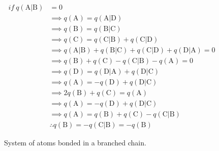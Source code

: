 \begin{align}
    if\: q(\mathrm{A}|\mathrm{B}) &= 0 \nonumber\\
      & \implies q(\mathrm{A}) = q(\mathrm{A}|\mathrm{D}) \nonumber \\
      & \implies q(\mathrm{B}) = q(\mathrm{B}|\mathrm{C}) \nonumber \\
      & \implies q(\mathrm{C}) = q(\mathrm{C}|\mathrm{B}) + q(\mathrm{C}|\mathrm{D}) \nonumber \\
      & \implies q(\mathrm{A}|\mathrm{B}) + q(\mathrm{B}|\mathrm{C}) + q(\mathrm{C}|\mathrm{D}) + q(\mathrm{D}|\mathrm{A}) = 0 \nonumber \\
      & \implies q(\mathrm{B}) + q(\mathrm{C}) - q(\mathrm{C}|\mathrm{B}) - q(\mathrm{A}) = 0 \nonumber \\
      & \implies q(\mathrm{D}) = q(\mathrm{D}|\mathrm{A}) + q(\mathrm{D}|\mathrm{C}) \nonumber \\
      & \implies q(\mathrm{A}) = -q(\mathrm{D}) + q(\mathrm{D}|\mathrm{C}) \nonumber \\
      & \implies 2q(\mathrm{B}) + q(\mathrm{C}) = q(\mathrm{A}) \nonumber \\
      & \implies q(\mathrm{A}) = -q(\mathrm{D}) + q(\mathrm{D}|\mathrm{C}) \nonumber \\
      & \implies q(\mathrm{A}) = q(\mathrm{B}) + q(\mathrm{C}) - q(\mathrm{C}|\mathrm{B}) \nonumber \\
      &\therefore q(\mathrm{B}) = -q(\mathrm{C}|\mathrm{B}) = -q(\mathrm{B})
\end{align}

\newpage

\vspace*{0.9cm}%
\begin{figure}[ht]
  \centering
  \scalebox{.4}{}
  \caption{System of atoms bonded in a branched chain.}
  \label{third_case}
\end{figure}

